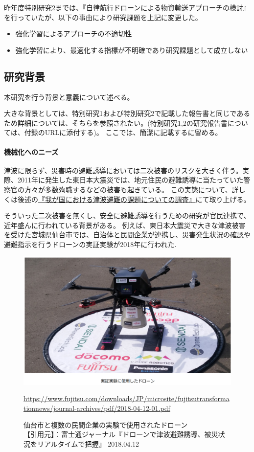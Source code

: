 \documentclass{article}[jsarticle]
\begin{document}
昨年度特別研究2までは、『自律航行ドローンによる物資輸送アプローチの検討』を行っていたが、以下の事由により研究課題を上記に変更した。
\begin{itemize}
    \item 強化学習によるアプローチの不適切性
    \item 強化学習により、最適化する指標が不明確であり研究課題として成立しない
\end{itemize}

\subsection{研究背景}
本研究を行う背景と意義について述べる。\par 
大きな背景としては、特別研究1および特別研究2で記載した報告書と同じであるため詳細については、そちらを参照されたい。(特別研究1,2の研究報告書については、付録のURLに添付する)。
ここでは、簡潔に記載するに留める。\par

\paragraph{機械化へのニーズ}
津波に限らず、災害時の避難誘導においては二次被害のリスクを大きく伴う。実際、2011年に発生した東日本大震災では、地元住民の避難誘導に当たっていた警察官の方々が多数殉職するなどの被害も起きている。
この実態について、詳しくは後述の\hyperref[sec:research-sec1]{『我が国における津波避難の課題についての調査』}にて取り上げる。 \par
そういった二次被害を無くし、安全に避難誘導を行うための研究が官民連携で、近年盛んに行われている背景がある。
例えば、東日本大震災で大きな津波被害を受けた宮城県仙台市では、自治体と民間企業が連携し、災害発生状況の確認や避難指示を行うドローンの実証実験が2018年に行われた.
\begin{figure}[H]
    \centering
    \includegraphics[scale=1.9]{./images/drone1.png}
    \caption{
       仙台市と複数の民間企業の実験で使用されたドローン \\
    【引用元】：富士通ジャーナル『ドローンで津波避難誘導、被災状況をリアルタイムで把握』 2018.04.12
    }
    \url{https://www.fujitsu.com/downloads/JP/microsite/fujitsutransformationnews/journal-archives/pdf/2018-04-12-01.pdf}
\end{figure}
\end{document}
